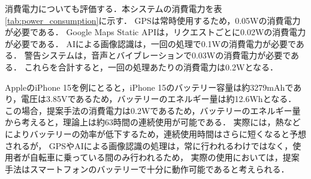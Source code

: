 \documentclass[uplatex,dvipdfmx]{jsarticle}
\begin{document}
消費電力についても評価する．本システムの消費電力を表\ref{tab:power_consumption}に示す．
GPSは常時使用するため，0.05Wの消費電力が必要である．
Google Maps Static APIは，リクエストごとに0.02Wの消費電力が必要である．
AIによる画像認識は，一回の処理で0.1Wの消費電力が必要である．
警告システムは，音声とバイブレーションで0.03Wの消費電力が必要である．
これらを合計すると，一回の処理あたりの消費電力は0.2Wとなる．
\par
AppleのiPhone 15を例にとると，iPhone 15のバッテリー容量は約3279mAhであり，電圧は3.85Vであるため，バッテリーのエネルギー量は約12.6Whとなる\cite{iphone_battery}．
この場合，提案手法の消費電力は0.2Wであるため，バッテリーのエネルギー量から考えると，理論上は約63時間の連続使用が可能である．
実際には，熱などによりバッテリーの効率が低下するため，連続使用時間はさらに短くなると予想されるが，
GPSやAIによる画像認識の処理は，常に行われるわけではなく，使用者が自転車に乗っている間のみ行われるため，
実際の使用においては，提案手法はスマートフォンのバッテリーで十分に動作可能であると考えられる．
\par
\end{document}

